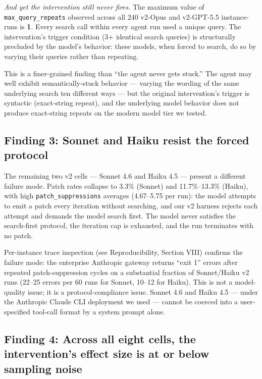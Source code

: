 \documentclass[journal]{IEEEtran}
\begin{document}
\emph{And yet the intervention still never fires.} The maximum value of \texttt{max\_query\_repeats} observed across all 240 v2-Opus and v2-GPT-5.5 instance-runs is \textbf{1}. Every search call within every agent run used a unique query. The intervention's trigger condition (3+ identical search queries) is structurally precluded by the model's behavior: these models, when forced to search, do so by varying their queries rather than repeating.

This is a finer-grained finding than ``the agent never gets stuck.'' The agent may well exhibit semantically-stuck behavior — varying the wording of the same underlying search ten different ways — but the original intervention's trigger is syntactic (exact-string repeat), and the underlying model behavior does not produce exact-string repeats on the modern model tier we tested.

\subsection{Finding 3: Sonnet and Haiku resist the forced protocol}

The remaining two v2 cells — Sonnet 4.6 and Haiku 4.5 — present a different failure mode. Patch rates collapse to 3.3\% (Sonnet) and 11.7\%--13.3\% (Haiku), with high \texttt{patch\_suppressions} averages (4.67--5.75 per run): the model attempts to emit a patch every iteration without searching, and our v2 harness rejects each attempt and demands the model search first. The model never satisfies the search-first protocol, the iteration cap is exhausted, and the run terminates with no patch.

Per-instance trace inspection (see Reproducibility, Section VIII) confirms the failure mode: the enterprise Anthropic gateway returns ``exit 1'' errors after repeated patch-suppression cycles on a substantial fraction of Sonnet/Haiku v2 runs (22--25 errors per 60 runs for Sonnet, 10--12 for Haiku). This is not a model-quality issue; it is a protocol-compliance issue. Sonnet 4.6 and Haiku 4.5 --- under the Anthropic Claude CLI deployment we used --- cannot be coerced into a user-specified tool-call format by a system prompt alone.

\subsection{Finding 4: Across all eight cells, the intervention's effect size is at or below sampling noise}
\end{document}
